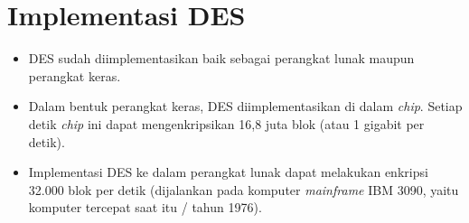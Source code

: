 \documentclass{article}
\begin{document}

\section*{Implementasi DES}

\begin{itemize}
    \item DES sudah diimplementasikan baik sebagai perangkat lunak maupun perangkat keras.
    \item Dalam bentuk perangkat keras, DES diimplementasikan di dalam \textit{chip}. Setiap detik \textit{chip} ini dapat mengenkripsikan 16,8 juta blok (atau 1 gigabit per detik).
    \item Implementasi DES ke dalam perangkat lunak dapat melakukan enkripsi 32.000 blok per detik (dijalankan pada komputer \textit{mainframe} IBM 3090, yaitu komputer tercepat saat itu / tahun 1976).
\end{itemize}
\end{document}

